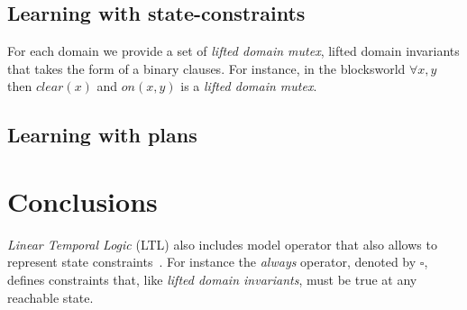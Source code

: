 \documentclass{article}
\begin{document}
\subsection{Learning with state-constraints}
For each domain we provide a set of {\em lifted domain mutex},  lifted domain invariants that takes the form of a binary clauses. For instance, in the blocksworld $\forall x,y$ then $clear(x)$ and $on(x,y)$ is a {\em lifted domain mutex}.

\subsection{Learning with plans}

\section{Conclusions}
{\em Linear Temporal Logic} (LTL) also includes model operator that also allows to represent state constraints~\cite{haslum:LTL:ecai10}. For instance the {\em always} operator, denoted by $\square$, defines constraints that, like {\em lifted domain invariants}, must be true at any reachable state.

\newpage



\end{document}
